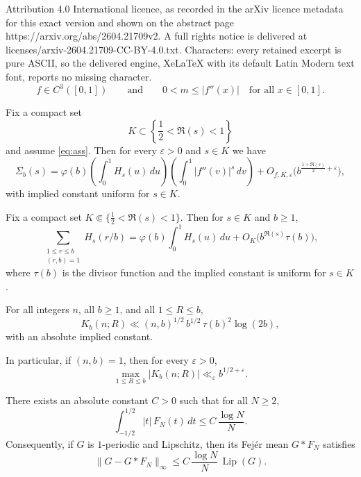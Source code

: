 \documentclass[10pt,a4paper]{amsart}
\begin{document}
Attribution 4.0 International licence, as recorded in the arXiv licence metadata for this exact version and shown on the abstract page https://arxiv.org/abs/2604.21709v2. A full rights notice is delivered at licenses/arxiv-2604.21709-CC-BY-4.0.txt. Characters: every retained excerpt is pure ASCII, so the delivered engine, XeLaTeX with its default Latin Modern text font, reports no missing character.
\begin{equation}
\label{eq:ass}
f\in C^3([0,1])
\qquad\text{and}\qquad
0<m\le |f''(x)|
\quad\text{for all }x\in[0,1].
\end{equation}

\begin{proposition}
\label{prop:spec}
Fix a compact set
\[
K\subset\left\{\frac12<\Re(s)<1\right\}
\]
and assume \eqref{eq:ass}. Then for every \(\varepsilon>0\) and \(s\in K\)
we have
\[
\Sigma_b(s)
=
\varphi(b)
\left(\int_0^1 H_s(u)\,du\right)
\left(\int_0^1 |f''(v)|^s\,dv\right)
+
O_{f,K,\varepsilon}
\bigl(b^{\frac{1+\Re(s)}{2}+\varepsilon}\bigr),
\]
with implied constant uniform for \(s\in K\).
\end{proposition}

\begin{lemma}
\label{lem:unitavg}
Fix a compact set $K\Subset\{\tfrac12<\Re(s)<1\}$. Then for $s\in K$ and $b\ge1$,
\[
\sum_{\substack{1\le r\le b\\(r,b)=1}} H_s(r/b)
=
\varphi(b)\int_0^1 H_s(u)\,du
+O_K\bigl(b^{\Re(s)}\tau(b)\bigr),
\]
where $\tau(b)$ is the divisor function and the implied constant is uniform for $s\in K$.
\end{lemma}

\begin{lemma}
\label{lem:inckloo}
For all integers \(n\), all \(b\ge 1\), and all \(1\le R\le b\),
\[
K_b(n;R)
\ll
(n,b)^{1/2}\,b^{1/2}\,\tau(b)^2\log(2b),
\]
with an absolute implied constant.

In particular, if \((n,b)=1\), then for every \(\varepsilon>0\),
\[
\max_{1\le R\le b}|K_b(n;R)|\ll_{\varepsilon} b^{1/2+\varepsilon}.
\]
\end{lemma}

\begin{lemma}
\label{lem:fejer_moment}
There exists an absolute constant \(C>0\) such that for all \(N\ge2\),
\[
\int_{-1/2}^{1/2} |t|\,F_N(t)\,dt\le C\,\frac{\log N}{N}.
\]
Consequently, if \(G\) is \(1\)-periodic and Lipschitz, then its Fej\'er mean \(G*F_N\) satisfies
\[
\|G-G*F_N\|_{\infty}\le C\,\frac{\log N}{N}\,\operatorname{Lip}(G).
\]
\end{lemma}
\end{document}
